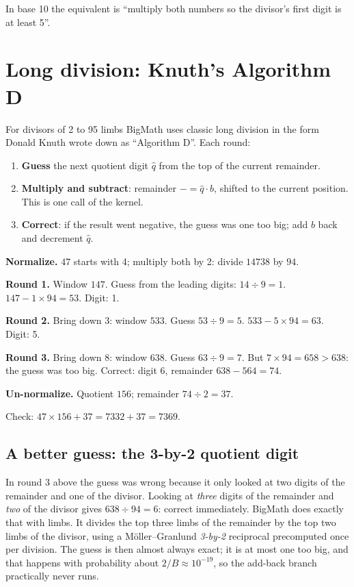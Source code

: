 In base 10 the equivalent is ``multiply both numbers so the divisor's first digit is at
least 5''.

\section{Long division: Knuth's Algorithm D}
\label{sec:knuth}

For divisors of 2 to 95 limbs BigMath uses classic long division in the form Donald Knuth
wrote down as ``Algorithm D''. Each round:

\begin{enumerate}
  \item \textbf{Guess} the next quotient digit $\hat q$ from the top of the current remainder.
  \item \textbf{Multiply and subtract}: remainder $\mathrel{-}= \hat q \cdot b$, shifted to the
        current position. This is one call of the  kernel.
  \item \textbf{Correct}: if the result went negative, the guess was one too big; add $b$
        back and decrement $\hat q$.
\end{enumerate}

\begin{example}
\textbf{Normalize.} $47$ starts with 4; multiply both by 2: divide $14738$ by $94$.

\textbf{Round 1.} Window $147$. Guess from the leading digits: $14 \div 9 = 1$.
$147 - 1 \times 94 = 53$. Digit: 1.

\textbf{Round 2.} Bring down 3: window $533$. Guess $53 \div 9 = 5$.
$533 - 5 \times 94 = 63$. Digit: 5.

\textbf{Round 3.} Bring down 8: window $638$. Guess $63 \div 9 = 7$. But
$7 \times 94 = 658 > 638$: the guess was too big. Correct: digit 6, remainder
$638 - 564 = 74$.

\textbf{Un-normalize.} Quotient $156$; remainder $74 \div 2 = 37$.

Check: $47 \times 156 + 37 = 7332 + 37 = 7369$.
\end{example}

\subsection{A better guess: the 3-by-2 quotient digit}

In round 3 above the guess was wrong because it only looked at two digits of the remainder
and one of the divisor. Looking at \emph{three} digits of the remainder and \emph{two} of the
divisor gives $638 \div 94 = 6$: correct immediately. BigMath does exactly that with limbs. It
divides the top three limbs of the remainder by the top two limbs of the divisor, using a
Möller--Granlund \emph{3-by-2} reciprocal precomputed once per division. The guess is then
almost always exact; it is at most one too big, and that happens with probability about
$2/B \approx 10^{-19}$, so the add-back branch practically never runs.

